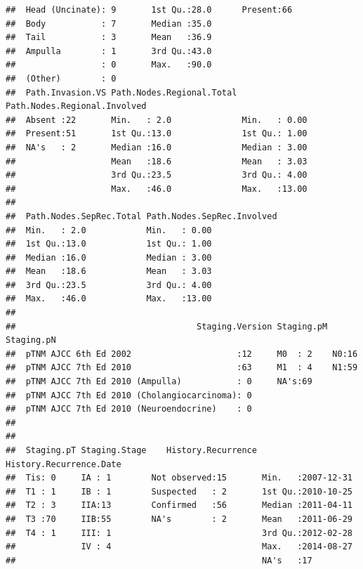 \documentclass{article}\usepackage[]{graphicx}\usepackage[]{color}
\makeatletter
\newenvironment{kframe}{%
 \def\at@end@of@kframe{}%
 \ifinner\ifhmode%
  \def\at@end@of@kframe{\end{minipage}}%
  \begin{minipage}{\columnwidth}%
 \fi\fi%
 \def\FrameCommand##1{\hskip\@totalleftmargin \hskip-\fboxsep
 \colorbox{shadecolor}{##1}\hskip-\fboxsep
     \hskip-\linewidth \hskip-\@totalleftmargin \hskip\columnwidth}%
 \MakeFramed {\advance\hsize-\width
   \@totalleftmargin\z@ \linewidth\hsize
   \@setminipage}}%
 {\par\unskip\endMakeFramed%
 \at@end@of@kframe}
\newenvironment{knitrout}{}{} %
\makeatother
\begin{document}
\begin{knitrout}
\begin{kframe}
\begin{verbatim}
##  Head (Uncinate): 9       1st Qu.:28.0      Present:66      
##  Body           : 7       Median :35.0                      
##  Tail           : 3       Mean   :36.9                      
##  Ampulla        : 1       3rd Qu.:43.0                      
##                 : 0       Max.   :90.0                      
##  (Other)        : 0                                         
##  Path.Invasion.VS Path.Nodes.Regional.Total Path.Nodes.Regional.Involved
##  Absent :22       Min.   : 2.0              Min.   : 0.00               
##  Present:51       1st Qu.:13.0              1st Qu.: 1.00               
##  NA's   : 2       Median :16.0              Median : 3.00               
##                   Mean   :18.6              Mean   : 3.03               
##                   3rd Qu.:23.5              3rd Qu.: 4.00               
##                   Max.   :46.0              Max.   :13.00               
##                                                                         
##  Path.Nodes.SepRec.Total Path.Nodes.SepRec.Involved
##  Min.   : 2.0            Min.   : 0.00             
##  1st Qu.:13.0            1st Qu.: 1.00             
##  Median :16.0            Median : 3.00             
##  Mean   :18.6            Mean   : 3.03             
##  3rd Qu.:23.5            3rd Qu.: 4.00             
##  Max.   :46.0            Max.   :13.00             
##                                                    
##                                    Staging.Version Staging.pM Staging.pN
##  pTNM AJCC 6th Ed 2002                     :12     M0  : 2    N0:16     
##  pTNM AJCC 7th Ed 2010                     :63     M1  : 4    N1:59     
##  pTNM AJCC 7th Ed 2010 (Ampulla)           : 0     NA's:69              
##  pTNM AJCC 7th Ed 2010 (Cholangiocarcinoma): 0                          
##  pTNM AJCC 7th Ed 2010 (Neuroendocrine)    : 0                          
##                                                                         
##                                                                         
##  Staging.pT Staging.Stage    History.Recurrence History.Recurrence.Date
##  Tis: 0     IA : 1        Not observed:15       Min.   :2007-12-31     
##  T1 : 1     IB : 1        Suspected   : 2       1st Qu.:2010-10-25     
##  T2 : 3     IIA:13        Confirmed   :56       Median :2011-04-11     
##  T3 :70     IIB:55        NA's        : 2       Mean   :2011-06-29     
##  T4 : 1     III: 1                              3rd Qu.:2012-02-28     
##             IV : 4                              Max.   :2014-08-27     
##                                                 NA's   :17             

\end{verbatim}
\end{kframe}
\end{knitrout}
\end{document}
